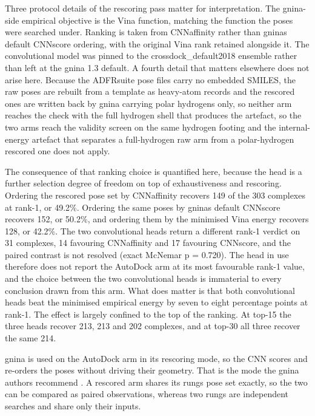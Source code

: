 Three protocol details of the rescoring pass matter for interpretation. The gnina-side empirical objective is the Vina function, matching the function the poses were searched under. Ranking is taken from CNNaffinity rather than gnina\textquotesingle s default CNNscore ordering, with the original Vina rank retained alongside it. The convolutional model was pinned to the crossdock\_default2018 ensemble rather than left at the gnina 1.3 default. A fourth detail that matters elsewhere does not arise here. Because the ADFRsuite pose files carry no embedded SMILES, the raw poses are rebuilt from a template as heavy-atom records and the rescored ones are written back by gnina carrying polar hydrogens only, so neither arm reaches the check with the full hydrogen shell that produces the artefact, so the two arms reach the validity screen on the same hydrogen footing and the internal-energy artefact that separates a full-hydrogen raw arm from a polar-hydrogen rescored one does not apply.

The consequence of that ranking choice is quantified here, because the head is a further selection degree of freedom on top of exhaustiveness and rescoring. Ordering the rescored pose set by CNNaffinity recovers 149 of the 303 complexes at rank-1, or 49.2\%. Ordering the same poses by gnina\textquotesingle s default CNNscore recovers 152, or 50.2\%, and ordering them by the minimised Vina energy recovers 128, or 42.2\%. The two convolutional heads return a different rank-1 verdict on 31 complexes, 14 favouring CNNaffinity and 17 favouring CNNscore, and the paired contrast is not resolved (exact McNemar p = 0.720). The head in use therefore does not report the AutoDock arm at its most favourable rank-1 value, and the choice between the two convolutional heads is immaterial to every conclusion drawn from this arm. What does matter is that both convolutional heads beat the minimised empirical energy by seven to eight percentage points at rank-1. The effect is largely confined to the top of the ranking. At top-15 the three heads recover 213, 213 and 202 complexes, and at top-30 all three recover the same 214.

gnina is used on the AutoDock arm in its rescoring mode, so the CNN scores and re-orders the poses without driving their geometry. That is the mode the gnina authors recommend \cite{ref056}. A rescored arm shares its rung\textquotesingle s pose set exactly, so the two can be compared as paired observations, whereas two rungs are independent searches and share only their inputs.

